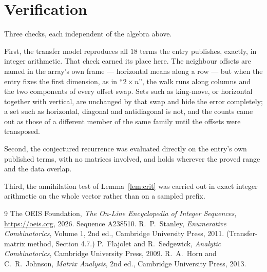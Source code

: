 \documentclass[11pt,a4paper]{article}
\theoremstyle{plain}
\theoremstyle{definition}
\begin{document}
\section{Verification}

Three checks, each independent of the algebra above.

First, the transfer model reproduces all $18$ terms the entry publishes, exactly, in
integer arithmetic. That check earned its place here. The neighbour offsets are named in the
array's own frame --- horizontal means along a row --- but when the entry fixes the first
dimension, as in ``$2\times n$'', the walk runs along columns and the two components of every
offset swap. Sets such as king-move, or horizontal together with vertical, are unchanged by
that swap and hide the error completely; a set such as horizontal, diagonal and antidiagonal
is not, and the counts came out as those of a different member of the same family until the
offsets were transposed.

Second, the conjectured recurrence was evaluated directly on the entry's own published terms,
with no matrices involved, and holds wherever the proved range and the data overlap.

Third, the annihilation test of Lemma~\ref{lem:crit} was carried out in exact integer
arithmetic on the whole vector rather than on a sampled prefix.

\begin{thebibliography}{9}
 The OEIS Foundation, \emph{The On-Line Encyclopedia of Integer
Sequences}, \url{https://oeis.org}, 2026. Sequence A238510.
 R.~P.~Stanley, \emph{Enumerative Combinatorics}, Volume 1, 2nd ed.,
Cambridge University Press, 2011. (Transfer-matrix method, Section 4.7.)
 P.~Flajolet and R.~Sedgewick, \emph{Analytic Combinatorics}, Cambridge
University Press, 2009.
 R.~A.~Horn and C.~R.~Johnson, \emph{Matrix Analysis}, 2nd ed., Cambridge
University Press, 2013.
\end{thebibliography}
\end{document}
